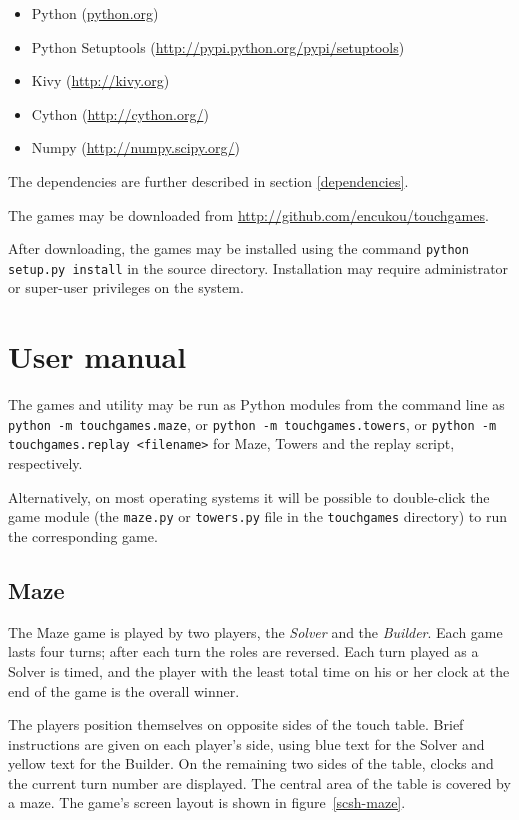 \documentclass[a4paper,11pt]{article}
\begin{document}
\begin{itemize}
\item Python (\url{python.org})
\item Python Setuptools (\url{http://pypi.python.org/pypi/setuptools})
\item Kivy (\url{http://kivy.org})
\item Cython (\url{http://cython.org/})
\item Numpy (\url{http://numpy.scipy.org/})
\end{itemize}

The dependencies are further described in section \ref{dependencies}.

The games may be downloaded from \url{http://github.com/encukou/touchgames}.

After downloading, the games may be installed using the command
\texttt{python setup.py install} in the source directory.
Installation may require administrator or super-user privileges on the system.

\section{User manual}

The games and utility may be run as Python modules from the command line as
\texttt{python -m touchgames.maze}, or
\texttt{python -m touchgames.towers}, or
\texttt{python -m touchgames.replay <filename>} for Maze, Towers and the replay
script, respectively.

Alternatively, on most operating systems it will be possible to double-click
the game module (the \texttt{maze.py} or \texttt{towers.py} file in the
\texttt{touchgames} directory) to run the corresponding game.

\subsection{Maze}

The Maze game is played by two players, the \emph{Solver} and the
\emph{Builder}.
Each game lasts four turns; after each turn the roles are reversed.
Each turn played as a Solver is timed, and the player with the least total
time on his or her clock at the end of the game is the overall winner.

The players position themselves on opposite sides of the touch table.
Brief instructions are given on each player's side, using blue text for the
Solver and yellow text for the Builder.
On the remaining two sides of the table, clocks and the current turn number
are displayed.
The central area of the table is covered by a maze.
The game's screen layout is shown in figure~\ref{scsh-maze}.
\end{document}
